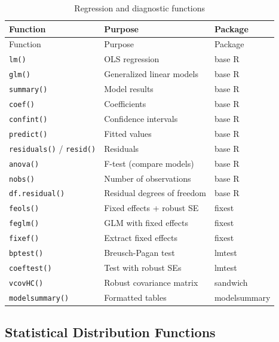 \documentclass[
  letterpaper,
  DIV=11,
  numbers=noendperiod]{scrreprt}
\begin{document}
\begin{longtable}[]{@{}lll@{}}
\caption{Regression and diagnostic
functions}\label{tbl-reg-ref}\tabularnewline
\toprule\noalign{}
Function & Purpose & Package \\
\midrule\noalign{}
\endfirsthead
\toprule\noalign{}
Function & Purpose & Package \\
\midrule\noalign{}
\endhead
\bottomrule\noalign{}
\endlastfoot
\texttt{lm()} & OLS regression & base R \\
\texttt{glm()} & Generalized linear models & base R \\
\texttt{summary()} & Model results & base R \\
\texttt{coef()} & Coefficients & base R \\
\texttt{confint()} & Confidence intervals & base R \\
\texttt{predict()} & Fitted values & base R \\
\texttt{residuals()} / \texttt{resid()} & Residuals & base R \\
\texttt{anova()} & F-test (compare models) & base R \\
\texttt{nobs()} & Number of observations & base R \\
\texttt{df.residual()} & Residual degrees of freedom & base R \\
\texttt{feols()} & Fixed effects + robust SE & fixest \\
\texttt{feglm()} & GLM with fixed effects & fixest \\
\texttt{fixef()} & Extract fixed effects & fixest \\
\texttt{bptest()} & Breusch-Pagan test & lmtest \\
\texttt{coeftest()} & Test with robust SEs & lmtest \\
\texttt{vcovHC()} & Robust covariance matrix & sandwich \\
\texttt{modelsummary()} & Formatted tables & modelsummary \\
\end{longtable}

\subsection{Statistical Distribution
Functions}\label{statistical-distribution-functions-1}
\end{document}
